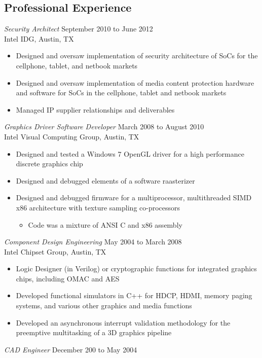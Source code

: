 \documentclass[margin]{res}
\begin{document}
\begin{resume}
\section{Professional Experience}
{\sl Security Architect} \hfill September 2010 to June 2012 \\
	Intel IDG, Austin, TX
\begin{itemize}
	\item Designed and oversaw implementation of security architecture of SoCs for the cellphone, tablet, and netbook markets
	\item Designed and oversaw implementation of media content protection hardware and software for SoCs in the cellphone, tablet and netbook markets
	\item Managed IP supplier relationships and deliverables
\end{itemize}
{\sl Graphics Driver Software Developer} \hfill March 2008 to August 2010 \\
	Intel Visual Computing Group, Austin, TX
\begin{itemize}
	\item Designed and tested a Windows 7 OpenGL driver for a high performance discrete graphics chip
	\item Designed and debugged elements of a software raasterizer
	\item Designed and debugged firmware for a multiprocessor, multithreaded SIMD x86 architecture with texture sampling co-processors
	\begin{itemize}
		\item Code was a mixture of ANSI C and x86 assembly
	\end{itemize}
\end{itemize}
{\sl Component Design Engineering} \hfill May 2004 to March 2008 \\
	Intel Chipset Group, Austin, TX
\begin{itemize}
	\item Logic Designer (in Verilog) or cryptographic functions for integrated graphics chips, including OMAC and AES
	\item Developed functional simulators in C++ for HDCP, HDMI, memory paging systems, and various other graphics and media functions
	\item Developed an asynchronous interrupt validation methodology for the preemptive multitasking of a 3D graphics pipeline
\end{itemize}
{\sl CAD Engineer} \hfill December 200 to May 2004 \\

\end{resume}
\end{document}
